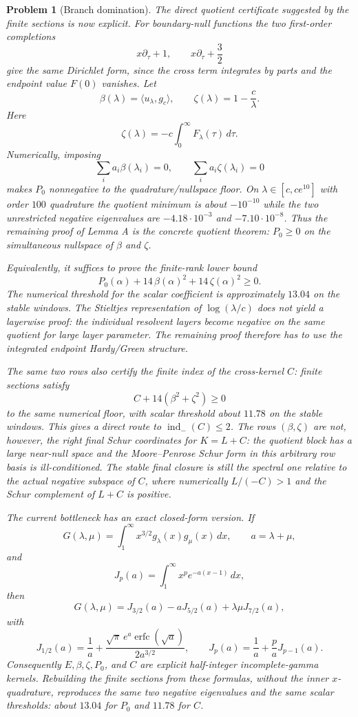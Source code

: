 \documentclass[11pt]{article}
\newtheorem{problem}[theorem]{Problem}
\begin{document}
\begin{problem}[Branch domination]
The direct quotient certificate suggested by the finite sections is now
explicit.  For boundary-null functions the two first-order completions
\[
  x\partial_\tau+1,\qquad x\partial_\tau+\frac32
\]
give the same Dirichlet form, since the cross term integrates by parts and
the endpoint value $F(0)$ vanishes.  Let
\[
  \beta(\lambda)=\langle u_\lambda,g_c\rangle,\qquad
  \zeta(\lambda)=1-\frac{c}{\lambda}.
\]
Here
\[
  \zeta(\lambda)=-c\int_0^\infty F_\lambda(\tau)\,d\tau.
\]
Numerically, imposing
\[
  \sum_i a_i\beta(\lambda_i)=0,\qquad
  \sum_i a_i\zeta(\lambda_i)=0
\]
makes $P_0$ nonnegative to the quadrature/nullspace floor.  On
$\lambda\in[c,ce^{10}]$ with order $100$ quadrature the quotient minimum is
about $-10^{-10}$ while the two unrestricted negative eigenvalues are
$-4.18\cdot10^{-3}$ and $-7.10\cdot10^{-8}$.  Thus the remaining proof of
Lemma A is the concrete quotient theorem: $P_0\ge0$ on the simultaneous
nullspace of $\beta$ and $\zeta$.

Equivalently, it suffices to prove the finite-rank lower bound
\[
  P_0(\alpha)+14\,\beta(\alpha)^2+14\,\zeta(\alpha)^2\ge0 .
\]
The numerical threshold for the scalar coefficient is approximately $13.04$
on the stable windows.  The Stieltjes representation of
$\log(\lambda/c)$ does not yield a layerwise proof: the individual resolvent
layers become negative on the same quotient for large layer parameter.  The
remaining proof therefore has to use the integrated endpoint Hardy/Green
structure.

The same two rows also certify the finite index of the cross-kernel $C$:
finite sections satisfy
\[
  C+14(\beta^2+\zeta^2)\ge0
\]
to the same numerical floor, with scalar threshold about $11.78$ on the stable
windows.  This gives a direct route to $\operatorname{ind}_-(C)\le2$.
The rows $(\beta,\zeta)$ are not, however, the right final Schur coordinates
for $K=L+C$: the quotient block has a large near-null space and the
Moore--Penrose Schur form in this arbitrary row basis is ill-conditioned.  The
stable final closure is still the spectral one relative to the actual negative
subspace of $C$, where numerically $L/(-C)>1$ and the Schur complement of
$L+C$ is positive.

The current bottleneck has an exact closed-form version.  If
\[
  G(\lambda,\mu)=\int_1^\infty x^{3/2}g_\lambda(x)g_\mu(x)\,dx,\qquad
  a=\lambda+\mu,
\]
and
\[
  J_p(a)=\int_1^\infty x^p e^{-a(x-1)}\,dx,
\]
then
\[
  G(\lambda,\mu)
  =J_{3/2}(a)-aJ_{5/2}(a)+\lambda\mu J_{7/2}(a),
\]
with
\[
  J_{1/2}(a)=\frac1a+
  \frac{\sqrt\pi\,e^a\operatorname{erfc}(\sqrt a)}{2a^{3/2}},
  \qquad
  J_p(a)=\frac1a+\frac{p}{a}J_{p-1}(a).
\]
Consequently $E,\beta,\zeta,P_0$, and $C$ are explicit half-integer
incomplete-gamma kernels.  Rebuilding the finite sections from these formulas,
without the inner $x$-quadrature, reproduces the same two negative eigenvalues
and the same scalar thresholds: about $13.04$ for $P_0$ and $11.78$ for $C$.


\end{problem}
\end{document}

